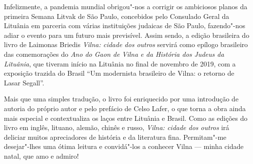 Infelizmente, a pandemia mundial obrigou"-nos a corrigir os ambiciosos
planos da primeira Semana Litvak de São Paulo, concebidos pelo Consulado
Geral da Lituânia em parceria com várias instituições judaicas de São
Paulo, fazendo"-nos adiar o evento para um futuro mais previsível. Assim
sendo, a edição brasileira do livro de Laimonas Briedis \textit{Vilna: cidade
dos outros} servirá como epílogo brasileiro das comemorações do
\textit{Ano do Gaon de Vilna e da História dos Judeus da Lituânia}, que
tiveram início na Lituânia no final de novembro de 2019, com a exposição
trazida do Brasil ``Um modernista brasileiro de Vilna: o retorno de
Lasar Segall''.

Mais que uma simples tradução, o livro foi enriquecido por uma
introdução de autoria do próprio autor e pelo prefácio de Celso Lafer, o
que torna a obra ainda mais especial e contextualiza os laços entre
Lituânia e Brasil. Como as edições do livro em inglês, lituano, alemão,
chinês e russo, \textit{Vilna: cidade dos outros} irá deliciar muitos
apreciadores de história e da literatura fina. Permitam"-me desejar"-lhes
uma ótima leitura e convidá"-los a conhecer Vilna --- minha cidade natal,
que amo e admiro!

